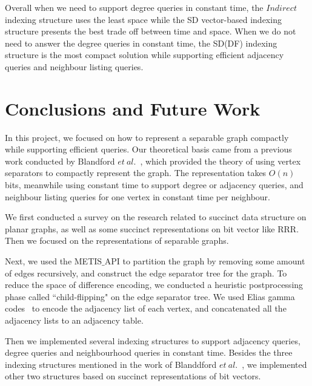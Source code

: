 \documentclass[12pt,glossary]{dalthesis}
\begin{document}
\bigskip
\bigskip

Overall when we need to support degree queries in constant time, the $Indirect$ indexing structure uses the least space while the SD vector-based indexing structure presents the best trade off between time and space. When we do not need to answer the degree queries in constant time, the SD(DF) indexing structure is the most compact solution while supporting efficient adjacency queries and neighbour listing queries.



\chapter{Conclusions and Future Work}

In this project, we focused on how to represent a separable graph compactly while supporting efficient queries. Our theoretical basis came from a previous work conducted by Blandford $et \ al.$~\cite{compact-representation}, which provided the theory of using vertex separators to compactly represent the graph. The representation takes $O(n)$ bits, meanwhile using constant time to support degree or adjacency queries, and neighbour listing queries for one vertex in constant time per neighbour. 

\bigskip
\bigskip

We first conducted a survey on the research related to succinct data structure on planar graphs, as well as some succinct representations on bit vector like RRR. Then we focused on the representations of separable graphs. 

\bigskip
\bigskip

Next, we used the METIS$\_$API to partition the graph by removing some amount of edges recursively, and construct the edge separator tree for the graph. To reduce the space of difference encoding, we conducted a heuristic postprocessing phase called ``child-flipping" on the edge separator tree. We used Elias gamma codes~\cite{Gamma} to encode the adjacency list of each vertex, and concatenated all the adjacency lists to an adjacency table.

\bigskip
\bigskip

Then we implemented several indexing structures to support adjacency queries, degree queries and neighbourhood queries in constant time. Besides the three indexing structures mentioned in the work of Blanddford $et \ al.$~\cite{compact-representation}, we implemented other two structures based on succinct representations of bit vectors.
\end{document}
